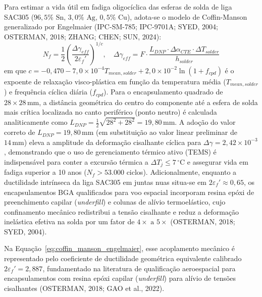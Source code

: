 Para estimar a vida útil em fadiga oligocíclica das esferas de solda de liga SAC305 ($96{,}5\%\text{ Sn}$, $3{,}0\%\text{ Ag}$, $0{,}5\%\text{ Cu}$), adota-se o modelo de Coffin-Manson generalizado por Engelmaier (IPC-SM-785; IPC-9701A; SYED, 2004; OSTERMAN, 2018; ZHANG; CHEN; SUN, 2024):
\begin{equation}
    N_f = \frac{1}{2} \left( \frac{\Delta \gamma_{eff}}{2 \varepsilon_f'} \right)^{1/c}, \quad \Delta \gamma_{eff} = F \cdot \frac{L_{DNP} \cdot \Delta \alpha_{CTE} \cdot \Delta T_{solder}}{h_{solder}}
    \label{eq:coffin_manson_engelmaier}
\end{equation}
em que $c = -0{,}470 - 7{,}0 \times 10^{-4} T_{mean,solder} + 2{,}0 \times 10^{-2} \ln(1 + f_{cpd})$ é o expoente de relaxação visco-plástica em função da temperatura média ($T_{mean,solder}$) e frequência cíclica diária ($f_{cpd}$). Para o encapsulamento quadrado de $28 \times 28\,\mathrm{mm}$, a distância geométrica do centro do componente até a esfera de solda mais crítica localizada no canto periférico (ponto neutro) é calculada analiticamente como $L_{DNP} = \frac{1}{2}\sqrt{28^2 + 28^2} = 19{,}80\,\mathrm{mm}$. A adoção do valor correto de $L_{DNP} = 19{,}80\,\mathrm{mm}$ (em substituição ao valor linear preliminar de $14\,\mathrm{mm}$) eleva a amplitude da deformação cisalhante cíclica para $\Delta\gamma = 2{,}42 \times 10^{-3}$, demonstrando que o uso de gerenciamento térmico ativo (TEMS) é indispensável para conter a excursão térmica a $\Delta T_j \le 7\,^\circ\mathrm{C}$ e assegurar vida em fadiga superior a 10 anos ($N_f > 53.000$ ciclos). Adicionalmente, enquanto a ductilidade intrínseca da liga SAC305 em juntas nuas situa-se em $2\varepsilon_f' \approx 0{,}65$, os encapsulamentos BGA qualificados para voo espacial incorporam resina epóxi de preenchimento capilar (\textit{underfill}) e colunas de alívio termoelástico, cujo confinamento mecânico redistribui a tensão cisalhante e reduz a deformação inelástica efetiva na solda por um fator de $4\times\text{ a }5\times$ (OSTERMAN, 2018; SYED, 2004). 

Na Equação~\ref{eq:coffin_manson_engelmaier}, esse acoplamento mecânico é representado pelo coeficiente de ductilidade geométrica equivalente calibrado $2\varepsilon_f' = 2{,}887$, fundamentado na literatura de qualificação aeroespacial para encapsulamentos com resina epóxi capilar (\textit{underfill}) para alívio de tensões cisalhantes (OSTERMAN, 2018; GAO et al., 2022). 

